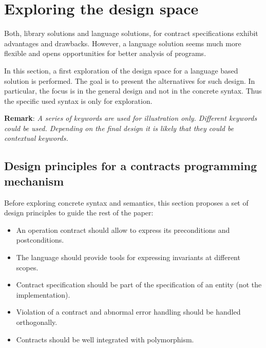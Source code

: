 \section{Exploring the design space}

Both, library solutions and language solutions, for contract specifications
exhibit advantages and drawbacks. However, a language solution seems much more
flexible and opens opportunities for better analysis of programs.

In this section, a first exploration of the design space for a language based
solution is performed. The goal is to present the alternatives for such design.
In particular, the focus is in the general design and not in the concrete
syntax. Thus the specific used syntax is only for exploration.

\vspace{1em}
\noindent
\textbf{Remark}: \emph{A series of keywords are used for illustration only. Different
keywords could be used. Depending on the final design it is likely that they
could be contextual keywords.}

\subsection{Design principles for a contracts programming mechanism}

Before exploring concrete syntax and semantics, this section proposes a set of
design principles to guide the rest of the paper:

\begin{itemize}

\item An operation contract should allow to express its preconditions and
postconditions.

\item The language should provide tools for expressing invariants at different
scopes.

\item Contract specification should be part of the specification of an entity
(not the implementation).

\item Violation of a contract and abnormal error handling should be handled
orthogonally.

\item Contracts should be well integrated with polymorphism.

\end{itemize}

